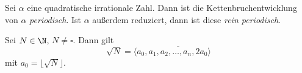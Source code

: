 \begin{thm}[Lagrange]\autolabel
	Sei $\alpha$ eine quadratische irrationale Zahl. Dann ist die Kettenbruchentwicklung von $\alpha$ \emph{periodisch}. Ist $\alpha$ außerdem reduziert, dann ist diese \emph{rein periodisch}.
\end{thm}

\begin{cor}\autolabel
	Sei $N \in \N$, $N \neq \square$. Dann gilt
	\[ \sqrt{N} = \langle a_0, \overbar{a_1,a_2,\dotsc,a_n,2a_0}\rangle \]
	mit $a_0 = \lfloor \sqrt{N} \rfloor$.
\end{cor}